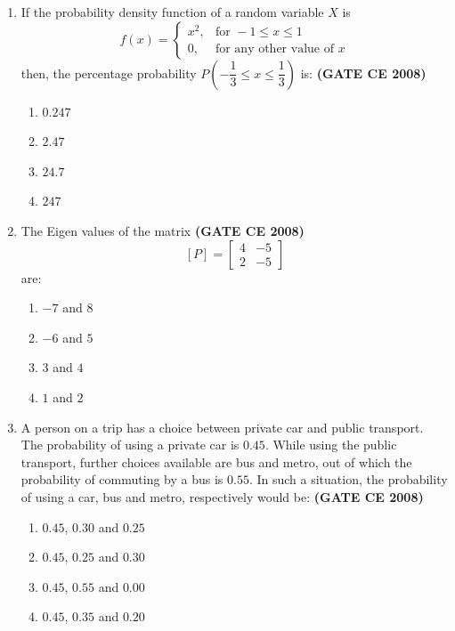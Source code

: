 \documentclass[journal]{IEEEtran}
\begin{document}
\begin{enumerate}
\item If the probability density function of a random variable $X$ is  
\[
f(x) = 
\begin{cases}
x^2, & \text{for } -1 \leq x \leq 1 \\
0, & \text{for any other value of } x
\end{cases}
\]
then, the percentage probability $P\left( -\dfrac{1}{3} \leq x \leq \dfrac{1}{3} \right)$ is: \textbf{(GATE CE 2008)}
\begin{multicols}{2}
\begin{enumerate}
\item $0.247$
\item $2.47$
\item $24.7$
\item $247$
\end{enumerate}
\end{multicols}

\item The Eigen values of the matrix \textbf{(GATE CE 2008)}
\[
[P] = \begin{bmatrix} 4 & -5 \\ 2 & -5 \end{bmatrix}
\]
are:
\begin{multicols}{2}
\begin{enumerate}
\item $-7$ and $8$
\item $-6$ and $5$
\item $3$ and $4$
\item $1$ and $2$
\end{enumerate}
\end{multicols}

\item A person on a trip has a choice between private car and public transport. The probability of using a private car is $0.45$. While using the public transport, further choices available are bus and metro, out of which the probability of commuting by a bus is $0.55$. In such a situation, the probability  of using a car, bus and metro, respectively would be: \textbf{(GATE CE 2008)}
\begin{multicols}{2}
\begin{enumerate}
\item $0.45$, $0.30$ and $0.25$
\item $0.45$, $0.25$ and $0.30$
\item $0.45$, $0.55$ and $0.00$
\item $0.45$, $0.35$ and $0.20$
\end{enumerate}
\end{multicols}


\end{enumerate}
\end{document}
